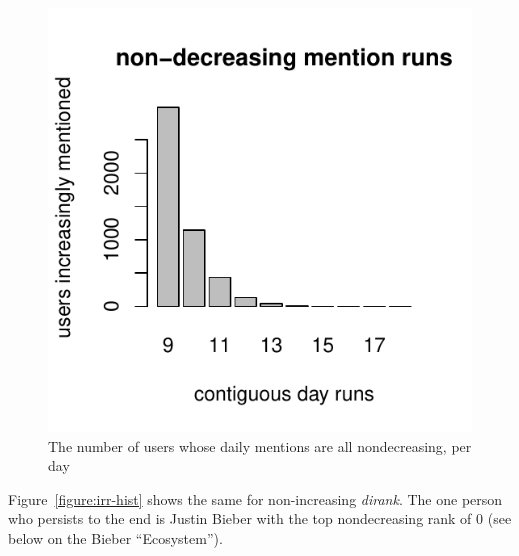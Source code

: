 \documentclass[10pt,oneside]{memoir}
\begin{document}
\begin{Spacing}{2}

\begin{figure}
\begin{center}
    \includegraphics{figures/nnm-hist}
    \caption{The number of users whose daily mentions are all nondecreasing, per day}
    \label{figure:nnm-hist}
\end{center}
\end{figure}
Figure~\ref{figure:irr-hist} shows the same for non-increasing {\itshape dirank}.  The one person who persists to the end is Justin Bieber with the top nondecreasing rank of 0 (see below on the Bieber ``Ecosystem'').





\end{Spacing}
\end{document}
